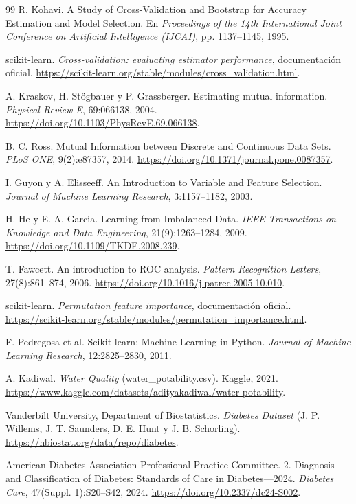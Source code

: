 \begin{thebibliography}{99}
R. Kohavi. A Study of Cross-Validation and Bootstrap for Accuracy Estimation and
Model Selection. En \emph{Proceedings of the 14th International Joint Conference on
Artificial Intelligence (IJCAI)}, pp. 1137--1145, 1995.

scikit-learn. \emph{Cross-validation: evaluating estimator performance},
documentación oficial.
\url{https://scikit-learn.org/stable/modules/cross_validation.html}.

A. Kraskov, H. Stögbauer y P. Grassberger. Estimating mutual information.
\emph{Physical Review E}, 69:066138, 2004.
\url{https://doi.org/10.1103/PhysRevE.69.066138}.

B. C. Ross. Mutual Information between Discrete and Continuous Data Sets.
\emph{PLoS ONE}, 9(2):e87357, 2014.
\url{https://doi.org/10.1371/journal.pone.0087357}.

I. Guyon y A. Elisseeff. An Introduction to Variable and Feature Selection.
\emph{Journal of Machine Learning Research}, 3:1157--1182, 2003.

H. He y E. A. Garcia. Learning from Imbalanced Data. \emph{IEEE Transactions on
Knowledge and Data Engineering}, 21(9):1263--1284, 2009.
\url{https://doi.org/10.1109/TKDE.2008.239}.

T. Fawcett. An introduction to ROC analysis. \emph{Pattern Recognition Letters},
27(8):861--874, 2006. \url{https://doi.org/10.1016/j.patrec.2005.10.010}.

scikit-learn. \emph{Permutation feature importance}, documentación oficial.
\url{https://scikit-learn.org/stable/modules/permutation_importance.html}.

F. Pedregosa et al. Scikit-learn: Machine Learning in Python. \emph{Journal of
Machine Learning Research}, 12:2825--2830, 2011.

A. Kadiwal. \emph{Water Quality} (water\_potability.csv). Kaggle, 2021.
\url{https://www.kaggle.com/datasets/adityakadiwal/water-potability}.

Vanderbilt University, Department of Biostatistics. \emph{Diabetes Dataset}
(J. P. Willems, J. T. Saunders, D. E. Hunt y J. B. Schorling).
\url{https://hbiostat.org/data/repo/diabetes}.

American Diabetes Association Professional Practice Committee. 2. Diagnosis and
Classification of Diabetes: Standards of Care in Diabetes---2024. \emph{Diabetes
Care}, 47(Suppl. 1):S20--S42, 2024. \url{https://doi.org/10.2337/dc24-S002}.
\end{thebibliography}
